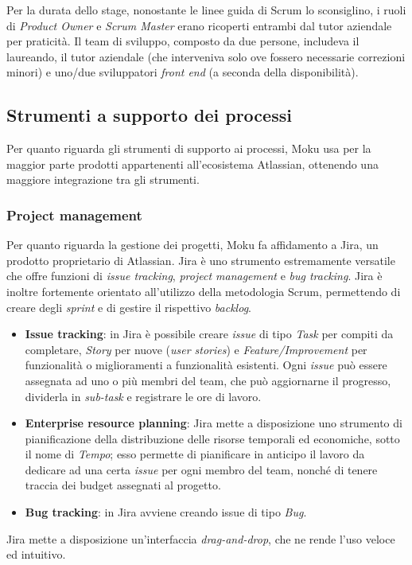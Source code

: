 Per la durata dello stage, nonostante le linee guida di Scrum lo sconsiglino, i ruoli di \textit{Product Owner} e \textit{Scrum Master} erano ricoperti entrambi dal tutor aziendale per praticità. Il team di sviluppo, composto da due persone, includeva il laureando, il tutor aziendale (che interveniva solo ove fossero necessarie correzioni minori) e uno/due sviluppatori \textit{front end} (a seconda della disponibilità).

\subsection{Strumenti a supporto dei processi}
Per quanto riguarda gli strumenti di supporto ai processi, Moku usa per la maggior parte prodotti appartenenti all'ecosistema Atlassian, ottenendo una maggiore integrazione tra gli strumenti.

\subsubsection{Project management}
Per quanto riguarda la gestione dei progetti, Moku fa affidamento a Jira, un prodotto proprietario di Atlassian. Jira è uno strumento estremamente versatile che offre funzioni di \textit{issue tracking}, \textit{project management} e \textit{bug tracking}. Jira è inoltre fortemente orientato all'utilizzo della metodologia Scrum, permettendo di creare degli \textit{sprint} e di gestire il rispettivo \textit{backlog}.
\begin{itemize}
    \item \textbf{Issue tracking}: in Jira è possibile creare \textit{issue} di tipo \textit{Task} per compiti da completare, \textit{Story} per nuove (\textit{user stories}) e \textit{Feature/Improvement} per funzionalità o miglioramenti a funzionalità esistenti. Ogni \textit{issue} può essere assegnata ad uno o più membri del team, che può aggiornarne il progresso, dividerla in \textit{sub-task} e registrare le ore di lavoro. 
    \item \textbf{Enterprise resource planning}: Jira mette a disposizione uno strumento di pianificazione della distribuzione delle risorse temporali ed economiche, sotto il nome di \textit{Tempo}; esso permette di pianificare in anticipo il lavoro da dedicare ad una certa \textit{issue} per ogni membro del team, nonché di tenere traccia dei budget assegnati al progetto.
    \item \textbf{Bug tracking}: in Jira avviene creando issue di tipo \textit{Bug}.
\end{itemize}
Jira mette a disposizione un'interfaccia \textit{drag-and-drop}, che ne rende l'uso veloce ed intuitivo.

